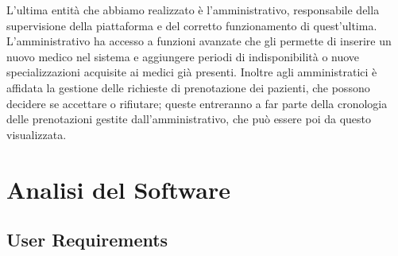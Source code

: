 \documentclass[12pt]{report}
\begin{document}
L'ultima entità che abbiamo realizzato è l'amministrativo, responsabile della supervisione della piattaforma e del corretto funzionamento di quest'ultima. L'amministrativo ha accesso a funzioni avanzate che gli permette di inserire un nuovo medico nel sistema e aggiungere periodi di indisponibilità o nuove specializzazioni acquisite ai medici già presenti. Inoltre agli amministratici è affidata la gestione delle richieste di prenotazione dei pazienti, che possono decidere se accettare o rifiutare; queste entreranno a far parte della cronologia delle prenotazioni gestite dall'amministrativo, che può essere poi da questo visualizzata.

    \newpage
    \chapter{Analisi del Software}
    \section{User Requirements}
\end{document}
